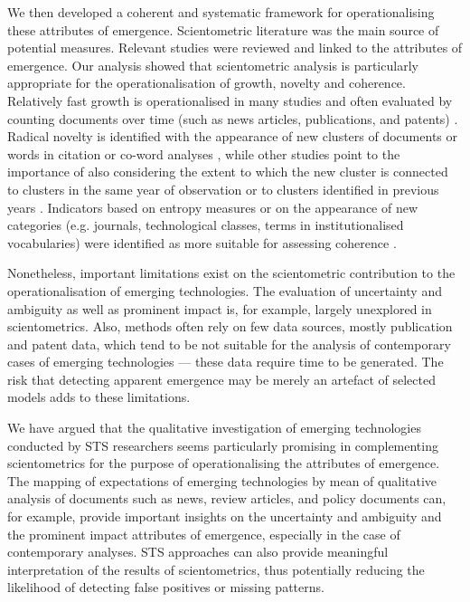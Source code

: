 \documentclass[11pt]{article}
\begin{document}
We then developed a coherent and systematic framework for operationalising these attributes of emergence. Scientometric literature was the main source of potential measures. Relevant studies were reviewed and linked to the attributes of emergence.  Our analysis showed that scientometric analysis is particularly appropriate for the operationalisation of growth, novelty and coherence.  Relatively fast growth is operationalised in many studies and often evaluated by counting documents over time (such as news articles, publications, and patents) \citep[e.g.][]{Porter1995}. Radical novelty is identified with the appearance of new clusters of documents or words in citation or co-word analyses \citep[e.g.][]{ Kajikawa2008}, while other studies point to the importance of also considering the extent to which the new cluster is connected to clusters in the same year of observation or to clusters identified in previous years \citep[e.g.][]{Small2014}. Indicators based on entropy measures or on the appearance of new categories (e.g. journals, technological classes, terms in institutionalised vocabularies) were identified as more suitable for assessing coherence \citep[e.g.][]{Cozzens2010}.

Nonetheless, important limitations exist on the scientometric contribution to the operationalisation of emerging technologies. The evaluation of uncertainty and ambiguity as well as prominent impact is, for example, largely unexplored in scientometrics. Also, methods often rely on few data sources, mostly publication and patent data, which tend to be not suitable for the analysis of contemporary cases of emerging technologies --- these data require time to be generated. The risk that detecting apparent emergence may be merely an artefact of selected models adds to these limitations. 

We have argued that the qualitative investigation of emerging technologies conducted by STS researchers seems particularly promising in complementing scientometrics for the purpose of operationalising the attributes of emergence. The mapping of expectations of emerging technologies by mean of qualitative analysis of documents such as news, review articles, and policy documents can, for example, provide important insights on the uncertainty and ambiguity and the prominent impact attributes of emergence, especially in the case of contemporary analyses. STS approaches can also provide meaningful interpretation of the results of scientometrics, thus potentially reducing the likelihood of detecting false positives or missing patterns.
\end{document}
